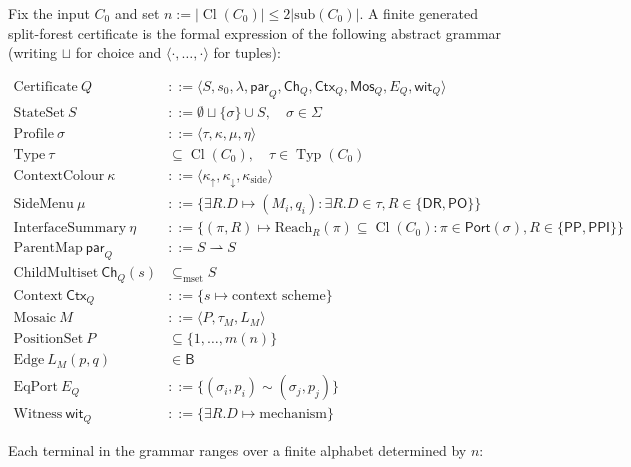 \documentclass[11pt]{article}
\newcommand{\Cl}{\operatorname{Cl}}
\newcommand{\Typ}{\operatorname{Typ}}
\newcommand{\PP}{\mathsf{PP}}
\newcommand{\PPI}{\mathsf{PPI}}
\newcommand{\PO}{\mathsf{PO}}
\newcommand{\DR}{\mathsf{DR}}
\newcommand{\Base}{\mathsf{B}}
\newcommand{\Port}{\mathsf{Port}}
\newcommand{\Mos}{\mathsf{Mos}}
\newcommand{\Ctx}{\mathsf{Ctx}}
\newcommand{\parr}{\mathsf{par}}
\begin{document}
Fix the input \(C_0\) and set \(n := |\Cl(C_0)| \le 2|\mathrm{sub}(C_0)|\).
A finite generated split-forest certificate is the formal expression
of the following abstract grammar (writing \(\sqcup\) for choice and
\(\langle\cdot,\dots,\cdot\rangle\) for tuples):

\begin{align*}
  \text{Certificate}\ Q
    &::= \langle S, s_0, \lambda, \parr_Q, \mathsf{Ch}_Q, \Ctx_Q,
            \Mos_Q, E_Q, \mathsf{wit}_Q \rangle \\
  \text{StateSet}\ S
    &::= \emptyset \sqcup \{\sigma\} \cup S, \quad \sigma \in \Sigma \\
  \text{Profile}\ \sigma
    &::= \langle \tau, \kappa, \mu, \eta \rangle \\
  \text{Type}\ \tau
    &\subseteq \Cl(C_0), \quad \tau \in \Typ(C_0) \\
  \text{ContextColour}\ \kappa
    &::= \langle \kappa_\uparrow, \kappa_\downarrow,
              \kappa_{\mathrm{side}} \rangle \\
  \text{SideMenu}\ \mu
    &::= \{ \exists R.D \mapsto (M_i, q_i) :
              \exists R.D \in \tau, R \in \{\DR,\PO\} \} \\
  \text{InterfaceSummary}\ \eta
    &::= \{ (\pi, R) \mapsto \mathrm{Reach}_R(\pi) \subseteq \Cl(C_0) :
              \pi \in \Port(\sigma), R \in \{\PP,\PPI\} \} \\
  \text{ParentMap}\ \parr_Q
    &::= S \rightharpoonup S \\
  \text{ChildMultiset}\ \mathsf{Ch}_Q(s)
    &\subseteq_{\mathrm{mset}} S \\
  \text{Context}\ \Ctx_Q
    &::= \{ s \mapsto \text{context scheme} \} \\
  \text{Mosaic}\ M
    &::= \langle P, \tau_M, L_M \rangle \\
  \text{PositionSet}\ P
    &\subseteq \{1, \dots, m(n)\} \\
  \text{Edge}\ L_M(p, q)
    &\in \Base \\
  \text{EqPort}\ E_Q
    &::= \{ (\sigma_i, p_i) \sim (\sigma_j, p_j) \} \\
  \text{Witness}\ \mathsf{wit}_Q
    &::= \{ \exists R.D \mapsto \text{mechanism} \}
\end{align*}

Each terminal in the grammar ranges over a finite alphabet
determined by \(n\):
\end{document}
